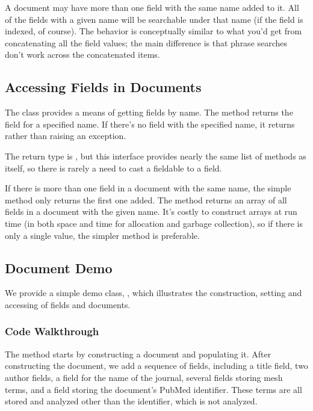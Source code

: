 A document may have more than one field with the same name added to
it.  All of the fields with a given name will be searchable under that
name (if the field is indexed, of course).  The behavior is
conceptually similar to what you'd get from concatenating all the
field values; the main difference is that phrase searches
don't work across the concatenated items.

\subsection{Accessing Fields in Documents}

The  class provides a means of getting fields by name.
The method  returns the field for a
specified name.  If there's no field with the specified name, it
returns  rather than raising an exception.

The return type is , but this interface provides
nearly the same list of methods as  itself, so there is
rarely a need to cast a fieldable to a field.  

If there is more than one field in a document with the same name, the
simple method  only returns the first one
added.  The method  returns an array of
all fields in a document with the given name.  It's costly to
construct arrays at run time (in both space and time for allocation
and garbage collection), so if there is only a single value, the
simpler method is preferable.


\subsection{Document Demo}

We provide a simple demo class, , which illustrates
the construction, setting and accessing of fields and documents.

\subsubsection{Code Walkthrough}

The  method starts by constructing a document and
populating it.
%
%
After constructing the document, we add a sequence of fields,
including a title field, two author fields, a field for the name of
the journal, several fields storing mesh terms, and a field storing
the document's PubMed identifier.
These terms are all stored
and analyzed other than the identifier, which is not analyzed.

